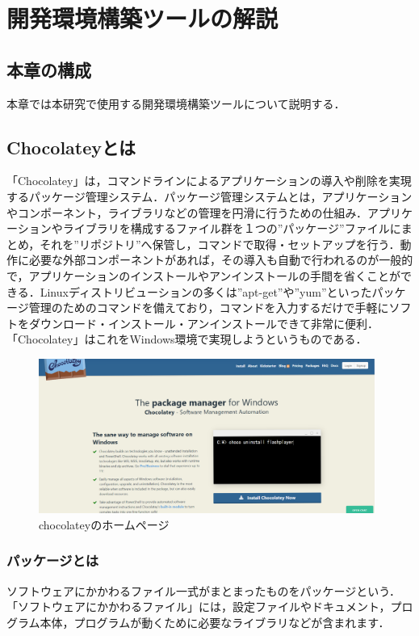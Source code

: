 \chapter{開発環境構築ツールの解説}

\section{本章の構成}
本章では本研究で使用する開発環境構築ツールについて説明する．

\section{Chocolateyとは}
「Chocolatey」は，コマンドラインによるアプリケーションの導入や削除を実現するパッケージ管理システム．パッケージ管理システムとは，アプリケーションやコンポーネント，ライブラリなどの管理を円滑に行うための仕組み．アプリケーションやライブラリを構成するファイル群を１つの”パッケージ”ファイルにまとめ，それを”リポジトリ”へ保管し，コマンドで取得・セットアップを行う．動作に必要な外部コンポーネントがあれば，その導入も自動で行われるのが一般的で，アプリケーションのインストールやアンインストールの手間を省くことができる．Linuxディストリビューションの多くは”apt-get”や”yum”といったパッケージ管理のためのコマンドを備えており，コマンドを入力するだけで手軽にソフトをダウンロード・インストール・アンインストールできて非常に便利．「Chocolatey」はこれをWindows環境で実現しようというものである．
\begin{figure}[htb]
\centering
\includegraphics[width=11cm]{04.png}
\caption{chocolateyのホームページ}\label{4}
\end{figure}

\subsection{パッケージとは}
ソフトウェアにかかわるファイル一式がまとまったものをパッケージという．「ソフトウェアにかかわるファイル」には，設定ファイルやドキュメント，プログラム本体，プログラムが動くために必要なライブラリなどが含まれます．

